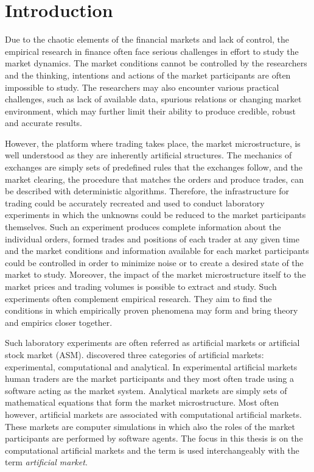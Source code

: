 \section{Introduction}

Due to the chaotic elements of the financial markets and lack of control, the 
empirical research in finance often face serious challenges in effort to study the 
market dynamics. The market conditions cannot be controlled by the researchers
and the thinking, intentions and actions of the market participants are often impossible to study. 
The researchers may also encounter various practical challenges, such as 
lack of available data, spurious relations or changing market environment, 
which may further limit their ability to produce credible, robust and accurate results. 

However, the platform where trading takes place, the market
microstructure, is well understood as they are inherently artificial structures. 
The mechanics of exchanges are simply sets of predefined rules 
that the exchanges follow, and the market clearing, the procedure 
that matches the orders and produce trades, can be described with 
deterministic algorithms. Therefore, the infrastructure for trading
could be accurately recreated and used to conduct laboratory 
experiments in which the unknowns could be reduced to the market participants
themselves. Such an experiment produces complete information about
the individual orders, formed trades and positions of each trader at any given time
and the market conditions and information available for each market participants could
be controlled in order to minimize noise or to create a desired state of the market to
study. Moreover, the impact of the market microstructure itself to the market prices and trading 
volumes is possible to extract and study. Such experiments often complement empirical research. 
They aim to find the conditions in which empirically proven phenomena may form and 
bring theory and empirics closer together. 


Such laboratory experiments are often referred as artificial markets or artificial
stock market (ASM). \citet{boer05} discovered three categories of artificial markets: 
experimental, computational and analytical. In experimental artificial markets human traders
are the market participants and they most often trade using a software acting as
the market system. Analytical markets are simply sets of mathematical equations that
form the market microstructure. Most often however, artificial markets are associated with 
computational artificial markets. These markets are computer simulations in which 
also the roles of the market participants are performed by software agents. The focus in this
thesis is on the computational artificial markets and the term is used interchangeably
with the term \textit{artificial market}. 

